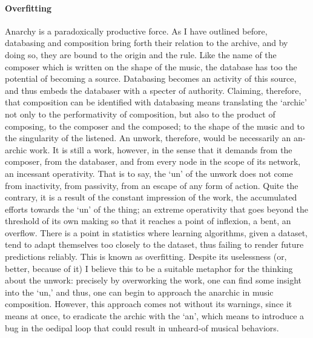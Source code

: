 \paragraph{Overfitting}
Anarchy is a paradoxically productive force. As I have outlined before, databasing and composition bring forth their relation to the archive, and by doing so, they are bound to the origin and the rule. Like the name of the composer which is written on the shape of the music, the database has too the potential of becoming a source. Databasing becomes an activity of this source, and thus embeds the databaser with a specter of authority. Claiming, therefore, that composition can be identified with databasing means translating the `archic' not only to the performativity of composition, but also to the product of composing, to the composer and the composed; to the shape of the music and to the singularity of the listened. An unwork, therefore, would be necessarily an an-archic work. It is still a work, however, in the sense that it demands from the composer, from the databaser, and from every node in the scope of its network, an incessant operativity. That is to say, the `un' of the unwork does not come from inactivity, from passivity, from an escape of any form of action. Quite the contrary, it is a result of the constant impression of the work, the accumulated efforts towards the `un' of the thing; an extreme operativity that goes beyond the threshold of its own making so that it reaches a point of inflexion, a bent, an overflow. There is a point in statistics where learning algorithms, given a dataset, tend to adapt themselves too closely to the dataset, thus failing to render future predictions reliably. This is known as overfitting. Despite its uselessness (or, better, because of it) I believe this to be a suitable metaphor for the thinking about the unwork: precisely by overworking the work, one can find some insight into the `un,' and thus, one can begin to approach the anarchic in music composition. However, this approach comes not without its warnings, since it means at once, to eradicate the archic with the `an', which means to introduce a bug in the oedipal loop that could result in unheard-of musical behaviors.
